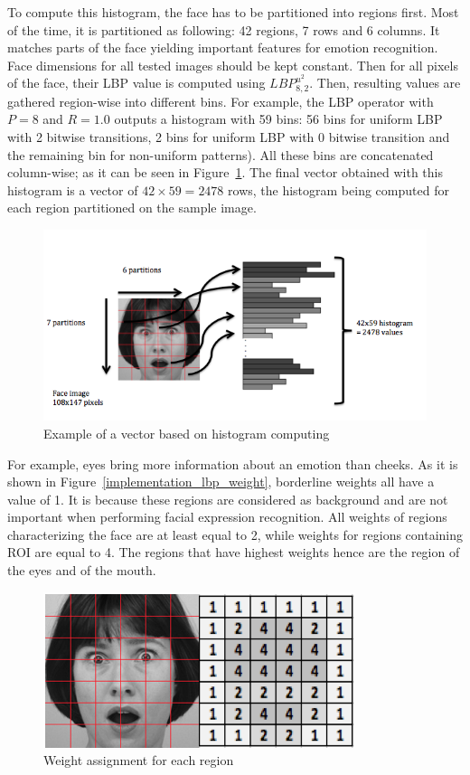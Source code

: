 \noindent To compute this histogram, the face has to be partitioned into regions first. Most of the time, it is partitioned as following: 42 regions, 7 rows and 6 columns. It matches parts of the face yielding important features for emotion recognition. Face dimensions for all tested images should be kept constant. Then for all pixels of the face, their LBP value is computed using $ LBP_{8,2}^{u^2} $. Then, resulting values are gathered region-wise into different bins. For example, the LBP operator with $ P = 8 $ and $ R = 1.0 $ outputs a histogram with 59 bins: 56 bins for uniform LBP with 2 bitwise transitions, 2 bins for  uniform LBP with 0 bitwise transition and the remaining bin for non-uniform patterns). All these bins are concatenated column-wise; as it can be seen in Figure~\ref{lbp_histogram}. The final vector obtained with this histogram is a vector of $ 42\times59 = 2478 $ rows, the histogram being computed for each region partitioned on the sample image.
\newline

\begin{figure}[!h]
\begin{center}
\noindent \includegraphics[scale=0.6]{figures/lbp_histogram} 
\newline
\caption{Example of a vector based on histogram computing}
\label{lbp_histogram}
\end{center} 
\end{figure}

\noindent For example, eyes bring more information about an emotion than cheeks. As it is shown in Figure~\ref{implementation_lbp_weight}, borderline weights all have a value of 1. It is because these regions are considered as background and are not important when performing facial expression recognition. All weights of regions characterizing the face are at least equal to 2, while weights for regions containing ROI are equal to 4. The regions that have highest weights hence are the region of the eyes and of the mouth.
\newline

\begin{figure}[!h]
\begin{center}
\noindent \includegraphics[scale=0.8]{figures/lbp_region_weight} 
\newline
\caption{Weight assignment for each region}
\label{lbp_region_weight}
\end{center} 
\end{figure}
\newpage
